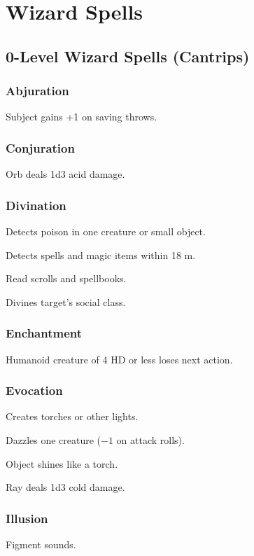 \section{Wizard Spells}



\subsection{0-Level Wizard Spells (Cantrips)}

\subsubsection{Abjuration}
	 Subject gains +1 on saving throws.

\subsubsection{Conjuration}
	 Orb deals 1d3 acid damage.

\subsubsection{Divination}
	 Detects poison in one creature or small object.

	 Detects spells and magic items within 18 m.

	 Read scrolls and spellbooks.

	 Divines target's social class. %

\subsubsection{Enchantment}
	 Humanoid creature of 4 HD or less loses next action.

\subsubsection{Evocation}
	 Creates torches or other lights.

	 Dazzles one creature ($-1$ on attack rolls).

	 Object shines like a torch.

	 Ray deals 1d3 cold damage.

\subsubsection{Illusion}
	 Figment sounds.

